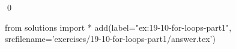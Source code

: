
\begin{ex}
  \label{ex:19-10-for-loops-part1}
  
  \qed
\end{ex}
\begin{python0}
from solutions import *
add(label="ex:19-10-for-loops-part1",
    srcfilename='exercises/19-10-for-loops-part1/answer.tex')
\end{python0}
